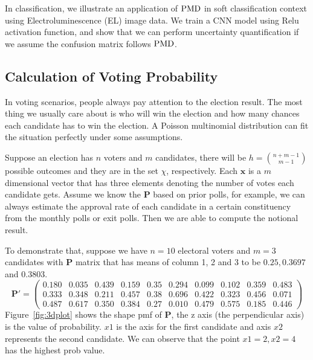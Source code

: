 \documentclass[12pt]{article}
\newcommand{\Pmat}{\mathbf{P}}
\newcommand{\PMD}{{\normalfont\textrm{PMD}}}
\newcommand{\xvec}{\boldsymbol{x}}
\begin{document}
In classification, we illustrate an application of $\PMD$ in soft classification context using Electroluminescence (EL) image data. We train a CNN model using Relu activation function, and show that we can perform uncertainty quantification if we assume the confusion matrix follows $\PMD$.


\subsection{Calculation of Voting Probability}
In voting scenarios, people always pay attention to the election result. The most thing we usually care about is who will win the election and how many chances each candidate has to win the election. A Poisson multinomial distribution can fit the situation perfectly under some assumptions.

Suppose an election has $n$ voters and $m$ candidates, there will be $h = \binom{n+m-1}{m-1}$ possible outcomes and they are in the set $\chi$, respectively. Each $\xvec$ is a $m$ dimensional vector that has three elements denoting the number of votes each candidate gets. Assume we know the $\Pmat$ based on prior polls, for example, we can always estimate the approval rate of each candidate in a certain constituency from the monthly polls or exit polls. Then we are able to compute the notional result.

To demonstrate that, suppose we have $n=10$ electoral voters and $m=3$ candidates with $\Pmat$ matrix that has means of column 1, 2 and 3 to be $0.25, 0.3697$ and $0.3803$.
\begin{equation*}
\Pmat' = \begin{pmatrix}
 0.180 &0.035 &0.439 &0.159 &0.35& 0.294 &0.099& 0.102& 0.359 &0.483\\
 0.333 &0.348 &0.211 &0.457 &0.38& 0.696 &0.422 &0.323 &0.456 &0.071\\
 0.487 &0.617& 0.350 &0.384& 0.27& 0.010 &0.479& 0.575& 0.185& 0.446
 \end{pmatrix}
\end{equation*}
Figure~\ref{fig:3dplot} shows the shape pmf of $\Pmat$, the z axis (the perpendicular axis) is the value of probability. $x1$ is the axis for the first candidate and axis $x2$ represents the second candidate. We can observe that the point $x1=2, x2=4$ has the highest prob value.
\end{document}
